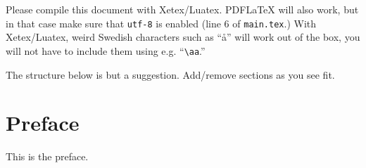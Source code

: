 \documentclass[11pt, a4paper]{article}
\begin{document}
Please compile this document with Xetex/Luatex. PDFLaTeX will also work, but in that case make sure that \texttt{utf-8} is enabled (line 6 of \texttt{main.tex}.) With Xetex/Luatex, weird Swedish characters such as ``å'' will work out of the box, you will not have to include them using e.g. ``\texttt{\textbackslash aa}.''

The structure below is but a suggestion. Add/remove sections as you see fit.

\thispagestyle{empty}

\newpage
\section*{Preface}

This is the preface.


\thispagestyle{empty}

\newpage

\begingroup
\hypersetup{linkcolor=black} %
\begin{spacing}{0.0}
\tableofcontents
\end{spacing}
\endgroup

\thispagestyle{empty}

\newpage
\setcounter{page}{1}






\newpage



\newpage



\newpage



\newpage



\newpage



\newpage



\newpage









\newpage
\appendix

\end{document}
